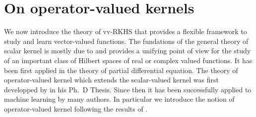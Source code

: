 \section{On operator-valued kernels}
\label{sec:background_on_operator-valued_kernels}
We now introduce the theory of \acf{vv-RKHS} that provides a flexible framework to study and learn vector-valued functions. The fundations of the general theory of scalar kernel is mostly due to \citet{Aronszajn1950}  and provides a unifying point of view for the study of an important class of Hilbert spaces of real or complex valued functions. It has been first applied in the theory of partial differential equation. The theory of operator-valued kernel which extends the scalar-valued kernel was first developped by \citet{Pedrick57} in his Ph.~D Thesis. Since then it has been successfully applied to machine learning by many authors. In particular we introduce the notion of operator-valued kernel following the results of \citet{Micchelli2005,carmeli2006vector,Carmeli2010}.

